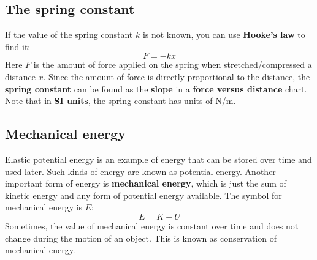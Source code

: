 \subsection{The spring constant}
%
If the value of the spring constant $k$ is not known, you can use \textbf{Hooke's law} to find it:
\begin{equation}
    F = -kx
\end{equation}
Here $F$ is the amount of force applied on the spring when stretched/compressed a distance $x$. Since the amount of force is directly proportional to the distance, the \textbf{spring constant} can be found as the \textbf{slope} in a \textbf{force versus distance} chart. Note that in \textbf{SI units}, the spring constant has units of N/m.
%
\subsection{Mechanical energy}
%
Elastic potential energy is an example of energy that can be stored over time and used later. Such kinds of energy are known as potential energy. Another important form of energy is \textbf{mechanical energy}, which is just the sum of kinetic energy and any form of potential energy available. The symbol for mechanical energy is $E$:
\begin{equation}
    E = K + U
\end{equation}
Sometimes, the value of mechanical energy is constant over time and does not change during the motion of an object. This is known as conservation of mechanical energy.
%

